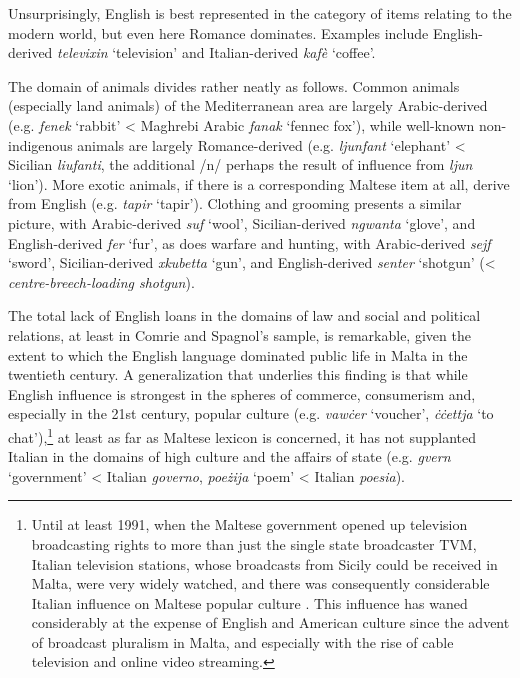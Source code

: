 \documentclass[output=paper]{langsci/langscibook}
\begin{document}
Unsurprisingly, English is best represented in the category of items relating to the modern world, but even here Romance dominates. Examples include English-derived \textit{televixin} `television' and Italian-derived \textit{kafè} `coffee'. 

The domain of animals divides rather neatly as follows. Common animals (especially land animals) of the Mediterranean area are largely Arabic-derived (e.g. \textit{fenek} `rabbit' < Maghrebi Arabic \textit{fanak} `fennec fox'), while well-known non-indigenous animals are largely Romance-derived (e.g. \textit{ljunfant} `elephant' < Sicilian \textit{liufanti}, the additional /n/ perhaps the result of influence from \textit{ljun} `lion'). More exotic animals, if there is a corresponding Maltese item at all, derive from English (e.g. \textit{tapir} `tapir'). Clothing and grooming presents a similar picture, with Arabic-derived \textit{suf} `wool', Sicilian-derived \textit{ngwanta} `glove', and English-derived \textit{fer} `fur', as does warfare and hunting, with Arabic-derived \textit{sejf} `sword', Sicilian-derived \textit{xkubetta} `gun', and English-derived \textit{senter} `shotgun' (< \textit{centre-breech-loading shotgun}).

The total lack of English loans in the domains of law and social and political relations, at least in Comrie and Spagnol's sample, is remarkable, given the extent to which the English language dominated public life in Malta in the twentieth century. A generalization that underlies this finding is that while English influence is strongest in the spheres of commerce, consumerism and, especially in the 21st century, popular culture (e.g. \textit{vawċer} `voucher', \textit{ċċettja} `to chat'),\footnote{Until at least 1991, when the Maltese government opened up television broadcasting rights to more than just the single state broadcaster TVM, Italian television stations, whose broadcasts from Sicily could be received in Malta, were very widely watched, and there was consequently considerable Italian influence on Maltese popular culture \citep{sammut2007}. This influence has waned considerably at the expense of English and American culture since the advent of broadcast pluralism in Malta, and especially with the rise of cable television and online video streaming.} at least as far as Maltese lexicon is concerned, it has not supplanted Italian in the domains of high culture and the affairs of state (e.g. \textit{gvern} `government' < Italian \textit{governo}, \textit{poeżija} `poem' < Italian \textit{poesia}).
\end{document}
